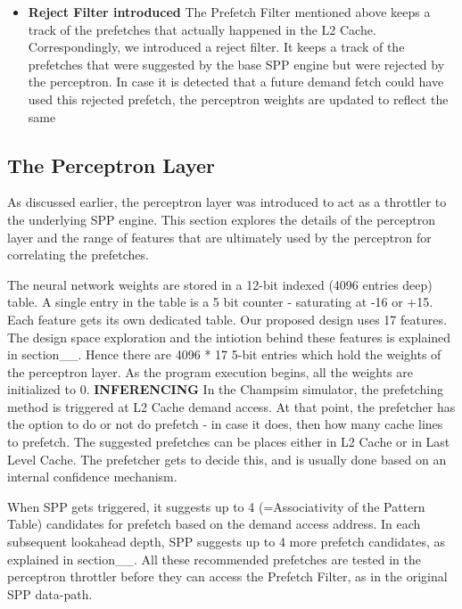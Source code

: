 \documentclass{sig-alternate}
\begin{document}
\begin{itemize}
\item \textbf{Reject Filter introduced}\newline
The Prefetch Filter mentioned above keeps a track of the prefetches that actually happened in the L2 Cache. Correspondingly, we introduced a reject filter. It keeps a track of the prefetches that were suggested by the base SPP engine but were rejected by the perceptron. In case it is detected that a future demand fetch could have used this rejected prefetch, the perceptron weights are updated to reflect the same

\end{itemize}

\subsection{The Perceptron Layer}
As discussed earlier, the perceptron layer was introduced to act as a throttler to the underlying SPP engine. This section explores the details of the perceptron layer and the range of features that are ultimately used by the perceptron for correlating the prefetches.

The neural network weights are stored in a 12-bit indexed (4096 entries deep) table. A single entry in the table is a 5 bit counter - saturating at -16 or +15. Each feature gets its own dedicated table. Our proposed design uses 17 features. The design space exploration and the intiotion behind these features is explained in section\_\_. Hence there are 4096 * 17 5-bit entries which hold the weights of the perceptron layer. As the program execution begins, all the weights are initialized to 0.
\newline
\newline
\textbf{INFERENCING}\newline
In the Champsim simulator, the prefetching method is triggered at L2 Cache demand access. At that point, the prefetcher has the option to do or not do prefetch - in case it does, then how many cache lines to prefetch. The suggested prefetches can be places either in L2 Cache or in Last Level Cache. The prefetcher gets to decide this, and is usually done based on an internal confidence mechanism.

When SPP gets triggered, it suggests up to 4 (=Associativity of the Pattern Table) candidates for prefetch based on the demand access address. In each subsequent lookahead depth, SPP suggests up to 4 more prefetch candidates, as explained in section\_\_. All these recommended prefetches are tested in the perceptron throttler before they can access the Prefetch Filter, as in the original SPP data-path.
\end{document}
